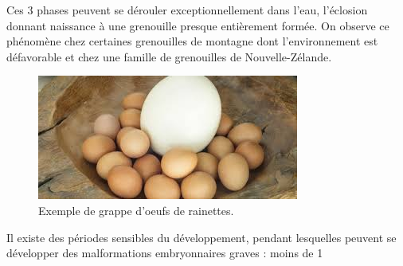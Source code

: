         Ces 3 phases peuvent se dérouler exceptionnellement dans l’eau, l’éclosion donnant naissance à une grenouille presque entièrement formée. On observe ce phénomène chez certaines grenouilles de montagne dont l’environnement est défavorable et chez une famille de grenouilles de Nouvelle-Zélande.
        	
\begin{figure}%
	\begin{center}
	\includegraphics[width=.9\textwidth]{laRepro/oeuf.jpg}	
	\end{center}
	\caption{Exemple de grappe d'oeufs de rainettes.}%
	\label{fig:autruche}%
\end{figure}

        Il existe des périodes sensibles du développement, pendant lesquelles peuvent se développer des malformations embryonnaires graves : moins de 1 %